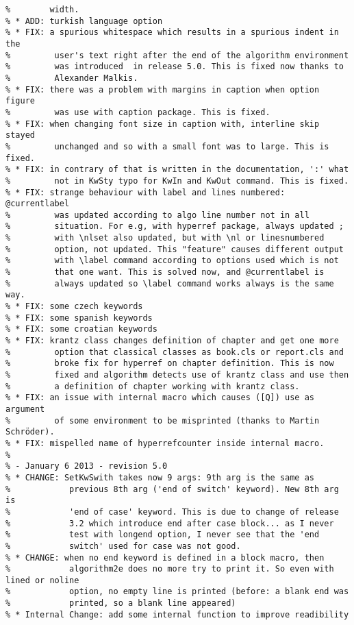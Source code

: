 \documentclass[a4paper]{article}
\begin{document}
\begin{verbatim}
%        width. 
% * ADD: turkish language option
% * FIX: a spurious whitespace which results in a spurious indent in the
%         user's text right after the end of the algorithm environment
%         was introduced  in release 5.0. This is fixed now thanks to
%         Alexander Malkis.
% * FIX: there was a problem with margins in caption when option figure
%         was use with caption package. This is fixed.
% * FIX: when changing font size in caption with, interline skip stayed
%         unchanged and so with a small font was to large. This is fixed.
% * FIX: in contrary of that is written in the documentation, ':' what
%         not in KwSty typo for KwIn and KwOut command. This is fixed. 
% * FIX: strange behaviour with label and lines numbered: @currentlabel
%         was updated according to algo line number not in all
%         situation. For e.g, with hyperref package, always updated ;
%         with \nlset also updated, but with \nl or linesnumbered
%         option, not updated. This "feature" causes different output
%         with \label command according to options used which is not
%         that one want. This is solved now, and @currentlabel is
%         always updated so \label command works always is the same way.
% * FIX: some czech keywords
% * FIX: some spanish keywords
% * FIX: some croatian keywords
% * FIX: krantz class changes definition of chapter and get one more
%         option that classical classes as book.cls or report.cls and
%         broke fix for hyperref on chapter definition. This is now
%         fixed and algorithm detects use of krantz class and use then
%         a definition of chapter working with krantz class.
% * FIX: an issue with internal macro which causes ([Q]) use as argument
%         of some environment to be misprinted (thanks to Martin Schröder).
% * FIX: mispelled name of hyperrefcounter inside internal macro.
%
% - January 6 2013 - revision 5.0
% * CHANGE: SetKwSwith takes now 9 args: 9th arg is the same as
%            previous 8th arg ('end of switch' keyword). New 8th arg is
%            'end of case' keyword. This is due to change of release
%            3.2 which introduce end after case block... as I never
%            test with longend option, I never see that the 'end
%            switch' used for case was not good.
% * CHANGE: when no end keyword is defined in a block macro, then
%            algorithm2e does no more try to print it. So even with lined or noline
%            option, no empty line is printed (before: a blank end was
%            printed, so a blank line appeared)
% * Internal Change: add some internal function to improve readibility

\end{verbatim}
\end{document}

